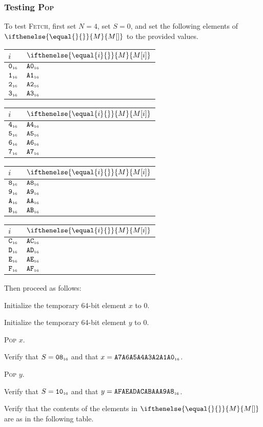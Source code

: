 \documentclass[a4paper,12pt]{article}
\makeatletter
\newcommand{\num}[1]{\texttt{#1}}
\newcommand{\hex}[1]{\num{#1}_{\textup{\tiny 16}}}
\newcommand{\MEM}[1]{\ifthenelse{\equal{#1}{}}{M}{M[#1]}}
\newcommand{\SP}{S}
\newcommand{\proc}[1]{\textsc{#1}}
\newenvironment{memtable}{%
  \begin{trivlist}
    \item
    }{%
    \end{trivlist}}
\newenvironment{memcolumn}{%
  \begin{tabular}{@{}ll@{}}
    $i$ & $\MEM{i}$ \\
    \hline}
    {%
    \hline
  \end{tabular}}
\newcommand{\memspace}{\qquad}
\makeatother
\begin{document}
\subsubsection{Testing \proc{Pop}}

To test \proc{Fetch}, first set $N=4$, set $S=0$, and set the following elements of $\MEM{}$ to the provided values.
\begin{memtable}
  \begin{memcolumn}
    $\hex{0}$ & $\hex{A0}$ \\
    $\hex{1}$ & $\hex{A1}$ \\
    $\hex{2}$ & $\hex{A2}$ \\
    $\hex{3}$ & $\hex{A3}$ \\
  \end{memcolumn}
  \memspace
  \begin{memcolumn}
    $\hex{4}$ & $\hex{A4}$ \\
    $\hex{5}$ & $\hex{A5}$ \\
    $\hex{6}$ & $\hex{A6}$ \\
    $\hex{7}$ & $\hex{A7}$ \\
  \end{memcolumn}
  \memspace
  \begin{memcolumn}
    $\hex{8}$ & $\hex{A8}$ \\
    $\hex{9}$ & $\hex{A9}$ \\
    $\hex{A}$ & $\hex{AA}$ \\
    $\hex{B}$ & $\hex{AB}$ \\
  \end{memcolumn}
  \memspace
  \begin{memcolumn}
    $\hex{C}$ & $\hex{AC}$ \\
    $\hex{D}$ & $\hex{AD}$ \\
    $\hex{E}$ & $\hex{AE}$ \\
    $\hex{F}$ & $\hex{AF}$ \\
  \end{memcolumn}
\end{memtable}
Then proceed as follows:
\begin{stepnumbers}
\item Initialize the temporary 64-bit element $x$ to $0$.
\item Initialize the temporary 64-bit element $y$ to $0$.
\item \proc{Pop} $x$.
\item Verify that $\SP = \hex{08}$ and that $x = \hex{A7A6A5A4A3A2A1A0}$.
\item \proc{Pop} $y$.
\item Verify that $\SP = \hex{10}$ and that $y = \hex{AFAEADACABAAA9A8}$.
\item Verify that the contents of the elements in $\MEM{}$ are as in the following table.
\end{stepnumbers}
\end{document}
